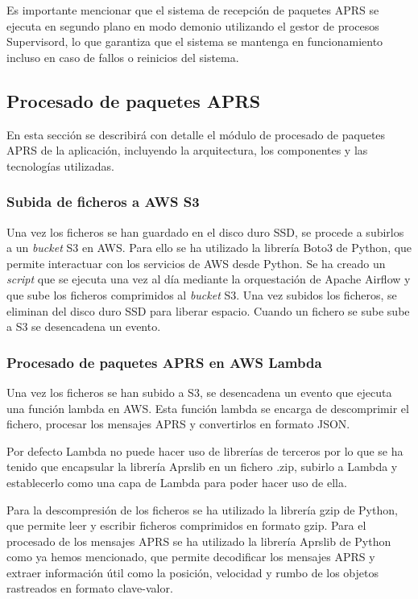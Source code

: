 Es importante mencionar que el sistema de recepción de paquetes APRS se ejecuta en segundo plano en modo demonio utilizando el gestor de procesos Supervisord, lo que garantiza que el sistema se mantenga en funcionamiento incluso en caso de fallos o reinicios del sistema.

\subsection{Procesado de paquetes APRS}
En esta sección se describirá con detalle el módulo de procesado de paquetes APRS de la aplicación, incluyendo la arquitectura, los componentes y las tecnologías utilizadas.

\subsubsection*{Subida de ficheros a AWS S3}

Una vez los ficheros se han guardado en el disco duro SSD, se procede a subirlos a un \textit{bucket} S3 en AWS. Para ello se ha utilizado la librería Boto3 de Python, que permite interactuar con los servicios de AWS desde Python. Se ha creado un \textit{script} que se ejecuta una vez al día mediante la orquestación de Apache Airflow y que sube los ficheros comprimidos al \textit{bucket} S3. Una vez subidos los ficheros, se eliminan del disco duro SSD para liberar espacio. Cuando un fichero se sube sube a S3 se desencadena un evento.

\subsubsection*{Procesado de paquetes APRS en AWS Lambda}

Una vez los ficheros se han subido a S3, se desencadena un evento que ejecuta una función lambda  en AWS. Esta función lambda se encarga de descomprimir el fichero, procesar los mensajes APRS y convertirlos en formato JSON.

Por defecto Lambda no puede hacer uso de librerías de terceros por lo que se ha tenido que encapsular la librería Aprslib en un fichero .zip, subirlo a Lambda y establecerlo como una capa de Lambda para poder hacer uso de ella.

Para la descompresión de los ficheros se ha utilizado la librería gzip de Python, que permite leer y escribir ficheros comprimidos en formato gzip.
Para el procesado de los mensajes APRS se ha utilizado la librería Aprslib de Python como ya hemos mencionado, que permite decodificar los mensajes APRS y extraer información útil como la posición, velocidad y rumbo de los objetos rastreados en formato clave-valor.


